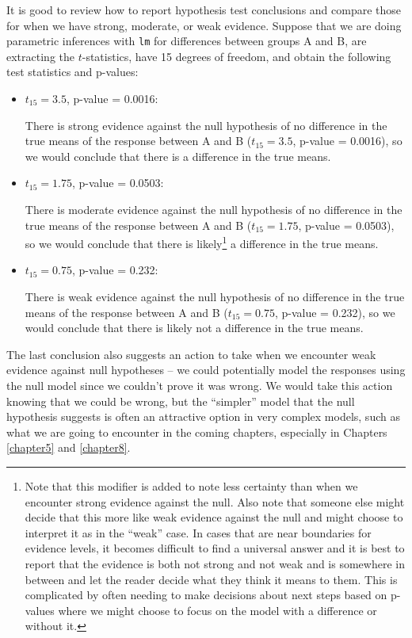 \documentclass[
]{book}
\begin{document}
\indent It is good to review how to report hypothesis test conclusions and compare those for when we have strong, moderate, or weak evidence. Suppose that we are doing parametric inferences with \texttt{lm} for differences between groups A and B, are extracting the \(t\)-statistics, have 15 degrees of freedom, and obtain the following test statistics and p-values:

\begin{itemize}
\item
  \(t_{15} = 3.5\), p-value = 0.0016:

  There is strong evidence against the null hypothesis of no difference in the true means of the response between A and B (\(t_{15} = 3.5\), p-value = 0.0016), so we would conclude that there is a difference in the true means.
\end{itemize}

\begin{itemize}
\item
  \(t_{15} = 1.75\), p-value = 0.0503:

  There is moderate evidence against the null hypothesis of no difference in the true means of the response between A and B (\(t_{15} = 1.75\), p-value = 0.0503), so we would conclude that there is likely\footnote{Note that this modifier is added to note less certainty than when we encounter strong evidence against the null. Also note that someone else might decide that this more like weak evidence against the null and might choose to interpret it as in the ``weak'' case. In cases that are near boundaries for evidence levels, it becomes difficult to find a universal answer and it is best to report that the evidence is both not strong and not weak and is somewhere in between and let the reader decide what they think it means to them. This is complicated by often needing to make decisions about next steps based on p-values where we might choose to focus on the model with a difference or without it.} a difference in the true means.
\item
  \(t_{15} = 0.75\), p-value = 0.232:

  There is weak evidence against the null hypothesis of no difference in the true means of the response between A and B (\(t_{15} = 0.75\), p-value = 0.232), so we would conclude that there is likely not a difference in the true means.
\end{itemize}

The last conclusion also suggests an action to take when we encounter weak evidence against null hypotheses -- we could potentially model the responses using the null model since we couldn't prove it was wrong. We would take this action knowing that we could be wrong, but the ``simpler'' model that the null hypothesis suggests is often an attractive option in very complex models, such as what we are going to encounter in the coming chapters, especially in Chapters \ref{chapter5} and \ref{chapter8}.
\end{document}

